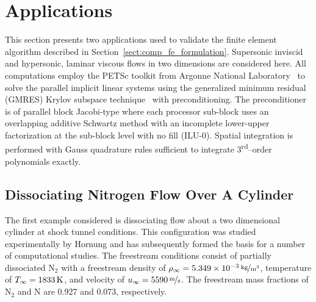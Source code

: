 \section{Applications\label{chap:compressible:applications}}
This section presents two applications used to validate  the finite element algorithm described in Section~\ref{sect:comp_fe_formulation}.  Supersonic inviscid and hypersonic, laminar viscous flows in two dimensions are considered here. All computations employ the PETSc toolkit from Argonne National Laboratory~\cite{petsc_manual} to solve the parallel implicit linear systems using the generalized minimum residual (GMRES) Krylov subspace technique~\cite{saad_schultz_gmres} with preconditioning.  The preconditioner is of parallel block Jacobi-type where each processor sub-block uses an overlapping additive Schwartz method with an incomplete lower-upper factorization at the sub-block level with no fill (ILU-0).  Spatial integration is performed with Gauss quadrature rules sufficient to integrate 3\textsuperscript{rd}--order polynomials exactly.

\subsection{Dissociating Nitrogen Flow Over A Cylinder\label{sec:comp_ns_cyl}}
The first example considered is dissociating flow about a two dimensional cylinder at shock tunnel conditions.  This configuration was studied experimentally by Hornung and has subsequently formed the basis for a number of computational studies.  The freestream conditions consist of partially dissociated N$_2$ with a freestream density of $\rho_\infty\unitfrac[=5.349\times 10^{-3}]{kg}{m^3}$, temperature of $T_\infty=\unit[1833]{K}$, and velocity of $u_\infty=\unitfrac[5590]{m}{s}$.  The freestream mass fractions of N$_2$ and N are 0.927 and 0.073, respectively.

